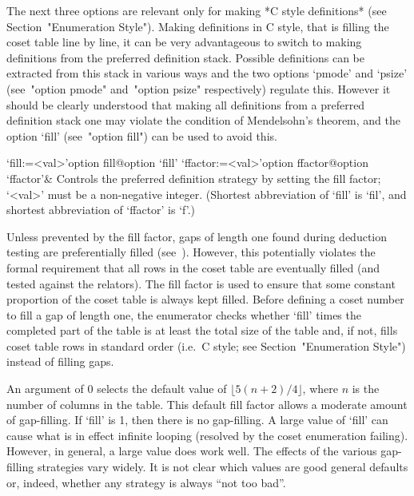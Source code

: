 \enditems


The  next  three  options  are  relevant  only  for  making  *C  style
definitions*  (see
Section~"Enumeration Style"). Making definitions in C style,  that  is
filling the coset table line by line, it can be very  advantageous  to
switch to making definitions  from  the  preferred  definition  stack.
Possible definitions can be extracted from this stack in various  ways
and  the  two  options  `pmode'  and   `psize'   (see~"option   pmode"
and~"option psize" respectively) regulate this. However it  should  be
clearly understood  that  making  all  definitions  from  a  preferred
definition  stack  one  may  violate  the  condition  of  Mendelsohn's
theorem, and the option `fill' (see~"option  fill")  can  be  used  to
avoid this.

\beginitems

\>`fill:=<val>'{option fill}@{option `fill'}
\>`ffactor:=<val>'{option ffactor}@{option `ffactor'}&
Controls the preferred definition strategy by setting the fill factor;
`<val>' must be a non-negative integer.
(Shortest abbreviation of `fill' is `fil', and  shortest  abbreviation
of `ffactor' is `f'.)

Unless prevented by the fill factor, gaps of length one  found  during
deduction  testing  are  preferentially   filled   (see~\cite{Hav91}).
However, this potentially violates the  formal  requirement  that  all
rows in the coset table are eventually filled (and tested against  the
relators). The fill factor  is  used  to  ensure  that  some  constant
proportion of the coset table is always kept filled. Before defining a
coset number to fill a  gap  of  length  one,  the  enumerator  checks
whether `fill' times the completed part of the table is at  least  the
total size of the table  and,  if  not,  fills  coset  table  rows  in
standard order (i.e.~C style; see Section~"Enumeration Style") instead
of filling gaps.

An  argument of  0  selects  the default  value  of $\lfloor  5(n+2)/4
\rfloor$,  where $n$  is the  number of  columns in  the  table.  This
default  fill factor  allows  a moderate  amount  of gap-filling.   If
`fill' is  1, then there is  no gap-filling.  A large  value of `fill'
can cause  what is in effect  infinite looping (resolved  by the coset
enumeration failing).   However, in general,  a large value  does work
well.  The  effects of the various gap-filling  strategies vary widely.
It is  not clear  which values are  good general defaults  or, indeed,
whether any strategy is always ``not too bad''.

